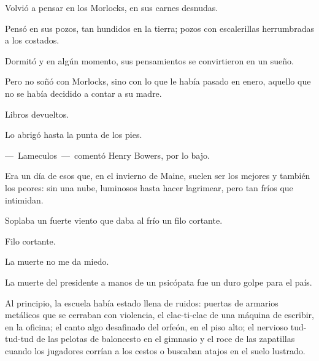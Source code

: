 \sk
Volvió a pensar en los Morlocks, en sus carnes desnudas.

\sk
Pensó en sus pozos, tan
hundidos en la tierra; pozos con escalerillas
herrumbradas a los costados.

\sk
Dormitó y en algún momento, sus pensamientos se convirtieron en un
sueño.

\sk
Pero no soñó con Morlocks, sino con lo que le
había pasado en enero, aquello que no se había
decidido a contar a su madre.

\sk
Libros devueltos. 

\sk
Lo abrigó hasta la punta de los pies.

\sk
---~Lameculos~---~comentó Henry Bowers, por lo bajo.

\sk
Era un día de esos que, en el invierno de
Maine, suelen ser los mejores y también los
peores: sin una nube, luminosos hasta hacer
lagrimear, pero tan fríos que intimidan.

\sk
Soplaba un fuerte viento que daba al frío un filo cortante.

\sk
Filo cortante. 

\sk
La muerte no me da miedo.

\sk
La muerte del presidente a manos de un psicópata fue un duro golpe para el país.

\sk
Al principio, la escuela
había estado llena de ruidos: puertas de armarios
metálicos que se cerraban con violencia, el clac-ti-clac
de una máquina de escribir, en la oficina; el
canto algo desafinado del orfeón, en el piso alto;
el nervioso tud-tud-tud de las pelotas de
baloncesto en el gimnasio y el roce de las
zapatillas cuando los jugadores corrían a los
cestos o buscaban atajos en el suelo lustrado.

